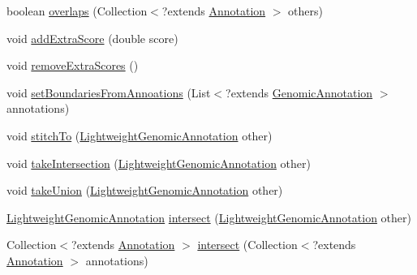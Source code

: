 \begin{DoxyCompactItemize}
\item 
boolean \hyperlink{classbroad_1_1core_1_1annotation_1_1_basic_lightweight_annotation_a8bcdc6badce8dafaee2e128b4cbc2266}{overlaps} (Collection$<$?extends \hyperlink{interfaceumms_1_1core_1_1annotation_1_1_annotation}{Annotation} $>$ others)
\item 
void \hyperlink{classbroad_1_1core_1_1annotation_1_1_basic_lightweight_annotation_a1abe79cd3414963158adf687374d6527}{add\+Extra\+Score} (double score)
\item 
void \hyperlink{classbroad_1_1core_1_1annotation_1_1_basic_lightweight_annotation_aa8d2b0cfe4dbbdae3461db23f0633700}{remove\+Extra\+Scores} ()
\item 
void \hyperlink{classbroad_1_1core_1_1annotation_1_1_basic_lightweight_annotation_a5487f0a8b3da26f5489787aeb030f816}{set\+Boundaries\+From\+Annoations} (List$<$?extends \hyperlink{interfacebroad_1_1core_1_1annotation_1_1_genomic_annotation}{Genomic\+Annotation} $>$ annotations)
\item 
void \hyperlink{classbroad_1_1core_1_1annotation_1_1_basic_lightweight_annotation_a91baf63b1c0a9334fa9a292f8064ed2b}{stitch\+To} (\hyperlink{interfacebroad_1_1core_1_1annotation_1_1_lightweight_genomic_annotation}{Lightweight\+Genomic\+Annotation} other)
\item 
void \hyperlink{classbroad_1_1core_1_1annotation_1_1_basic_lightweight_annotation_af01c10d4a47dfaab7759d18b4281c09b}{take\+Intersection} (\hyperlink{interfacebroad_1_1core_1_1annotation_1_1_lightweight_genomic_annotation}{Lightweight\+Genomic\+Annotation} other)
\item 
void \hyperlink{classbroad_1_1core_1_1annotation_1_1_basic_lightweight_annotation_adfbce23fbb97636400eab0f450f3f828}{take\+Union} (\hyperlink{interfacebroad_1_1core_1_1annotation_1_1_lightweight_genomic_annotation}{Lightweight\+Genomic\+Annotation} other)
\item 
\hyperlink{interfacebroad_1_1core_1_1annotation_1_1_lightweight_genomic_annotation}{Lightweight\+Genomic\+Annotation} \hyperlink{classbroad_1_1core_1_1annotation_1_1_basic_lightweight_annotation_a9174257fd599f54ae720c92aecb1fed4}{intersect} (\hyperlink{interfacebroad_1_1core_1_1annotation_1_1_lightweight_genomic_annotation}{Lightweight\+Genomic\+Annotation} other)
\item 
Collection$<$?extends \hyperlink{interfaceumms_1_1core_1_1annotation_1_1_annotation}{Annotation} $>$ \hyperlink{classbroad_1_1core_1_1annotation_1_1_basic_lightweight_annotation_ad2ad89d3c80fc12f3837724b95257fc0}{intersect} (Collection$<$?extends \hyperlink{interfaceumms_1_1core_1_1annotation_1_1_annotation}{Annotation} $>$ annotations)

\end{DoxyCompactItemize}
